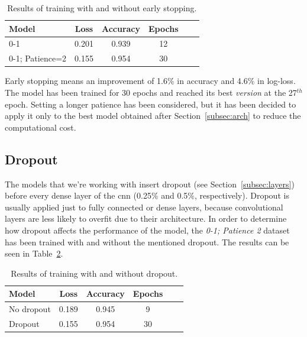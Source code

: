 \begin{table}
	\centering
	\begin{tabular}{l*{4}{c}r}
		\textbf{Model} & \textbf{Loss} & \textbf{Accuracy} & \textbf{Epochs} \\
		\hline
		0-1 & 0.201 & 0.939 & 12 \\
		0-1; Patience=2 & 0.155 & 0.954 & 30 \\
	\end{tabular}
	\caption{Results of training with and without early stopping.}
	\label{tbl:earlystopping}
\end{table}

Early stopping means an improvement of 1.6\% in accuracy and 4.6\% in log-loss. The model has been trained for 30 epochs and reached its best \textit{version} at the 27$^{th}$ epoch. Setting a longer patience has been considered, but it has been decided to apply it only to the best model obtained after Section~\ref{subsec:arch} to reduce the computational cost.

\subsection{Dropout}
The models that we're working with insert dropout (see Section~\ref{subsec:layers}) before every dense layer of the \gls{cnn} (0.25\% and 0.5\%, respectively). Dropout is usually applied just to fully connected or dense layers, because convolutional layers are less likely to overfit due to their architecture. In order to determine how dropout affects the performance of the model, the \textit{0-1; Patience 2} dataset has been trained with and without the mentioned dropout. The results can be seen in Table~\ref{tbl:dropout}. 
\begin{table}
	\centering
	\begin{tabular}{l*{4}{c}r}
		\textbf{Model} & \textbf{Loss} & \textbf{Accuracy} & \textbf{Epochs} \\
		\hline
		No dropout & 0.189 & 0.945 & 9 \\
		Dropout & 0.155 & 0.954 & 30 \\
	\end{tabular}
	\caption{Results of training with and without dropout.}
	\label{tbl:dropout}
\end{table}

